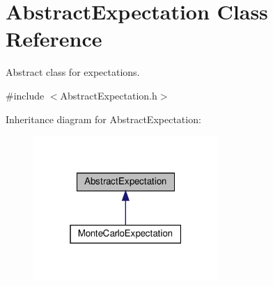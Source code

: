 \hypertarget{classAbstractExpectation}{}\section{Abstract\+Expectation Class Reference}
\label{classAbstractExpectation}


Abstract class for expectations.  




{\ttfamily \#include $<$Abstract\+Expectation.\+h$>$}



Inheritance diagram for Abstract\+Expectation\+:\nopagebreak
\begin{figure}[H]
\begin{center}
\leavevmode
\includegraphics[width=199pt]{classAbstractExpectation__inherit__graph}
\end{center}
\end{figure}
